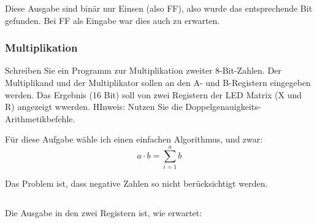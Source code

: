 \begin{multicols}{9}
	\inputminted[fontsize=\footnotesize]{text}{f.txt}
\end{multicols}

Diese Ausgabe sind binär nur Einsen (also FF), also wurde das entsprechende Bit
gefunden. Bei FF als Eingabe war dies auch zu erwarten.

\subsubsection{Multiplikation}

\begin{problem}
	Schreiben Sie ein Programm zur Multiplikation zweiter 8-Bit-Zahlen. Der
	Multiplikand und der Multiplikator sollen an den A- und B-Registern
	eingegeben werden. Das Ergebnis (16 Bit) soll von zwei Registern der LED
	Matrix (X und R) angezeigt wwerden. HInweis: Nutzen Sie die
	Doppelgenauigkeits-Arithmetikbefehle.
\end{problem}

Für diese Aufgabe wähle ich einen einfachen Algorithmus, und zwar:
\[
	a \cdot b = \sum_{i = 1}^{a} b
\]

Das Problem ist, dass negative Zahlen so nicht berücksichtigt werden.

\inputminted[fontsize=\small, linenos]{cpp}{../Prototypen/g.cpp}

Die Ausgabe in den zwei Registern ist, wie erwartet:

\begin{multicols}{9}
	\inputminted[fontsize=\footnotesize]{text}{g.txt}
\end{multicols}


\FloatBarrier
\IfFileExists{\bibliographyfile}{
	
}{}



